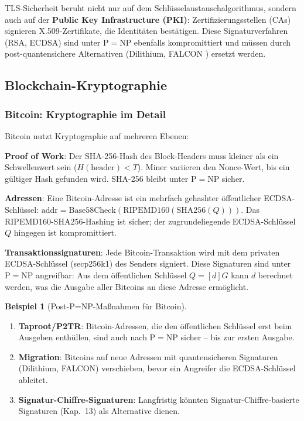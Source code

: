 ﻿\documentclass[a4paper,12pt]{scrreprt}
\theoremstyle{definition}
\newtheorem{beispiel}{Beispiel}[section]
\begin{document}
TLS-Sicherheit beruht nicht nur auf dem Schlüsselaustauschalgorithmus, sondern auch auf der \textbf{Public Key Infrastructure (PKI)}: Zertifizierungsstellen (CAs) signieren X.509-Zertifikate, die Identitäten bestätigen. Diese Signaturverfahren (RSA, ECDSA) sind unter $\mathrm{P}=\mathrm{NP}$ ebenfalls kompromittiert und müssen durch post-quantensichere Alternativen (Dilithium, FALCON \cite{NIST22}) ersetzt werden.

\subsection{Blockchain-Kryptographie}

\subsubsection{Bitcoin: Kryptographie im Detail}

Bitcoin \cite{Nak08} nutzt Kryptographie auf mehreren Ebenen:

\textbf{Proof of Work}: Der SHA-256-Hash des Block-Headers muss kleiner als ein Schwellenwert sein ($H(\text{header}) < T$). Miner variieren den Nonce-Wert, bis ein gültiger Hash gefunden wird. SHA-256 bleibt unter $\mathrm{P}=\mathrm{NP}$ sicher.

\textbf{Adressen}: Eine Bitcoin-Adresse ist ein mehrfach gehashter öffentlicher ECDSA-Schlüssel: $\mathrm{addr} = \mathrm{Base58Check}(\mathrm{RIPEMD160}(\mathrm{SHA256}(Q)))$. Das RIPEMD160-SHA256-Hashing ist sicher; der zugrundeliegende ECDSA-Schlüssel $Q$ hingegen ist kompromittiert.

\textbf{Transaktionssignaturen}: Jede Bitcoin-Transaktion wird mit dem privaten ECDSA-Schlüssel (secp256k1) des Senders signiert. Diese Signaturen sind unter $\mathrm{P}=\mathrm{NP}$ angreifbar: Aus dem öffentlichen Schlüssel $Q = [d]G$ kann $d$ berechnet werden, was die Ausgabe aller Bitcoins an diese Adresse ermöglicht.

\begin{beispiel}[Post-P=NP-Maßnahmen für Bitcoin]
\begin{enumerate}
    \item \textbf{Taproot/P2TR}: Bitcoin-\newline Adressen, die den öffentlichen Schlüssel erst beim Ausgeben enthüllen, sind auch nach $\mathrm{P}=\mathrm{NP}$ sicher -- bis zur ersten Ausgabe.
    \item \textbf{Migration}: Bitcoins auf neue Adressen mit quantensicheren Signaturen (Dilithium, FALCON) verschieben, bevor ein Angreifer die ECDSA-Schlüssel ableitet.
    \item \textbf{Signatur-Chiffre-Signaturen}: Langfristig könnten Signatur-Chiffre-basierte Signaturen (Kap.~13) als Alternative dienen.
\end{enumerate}
\end{beispiel}
\end{document}
